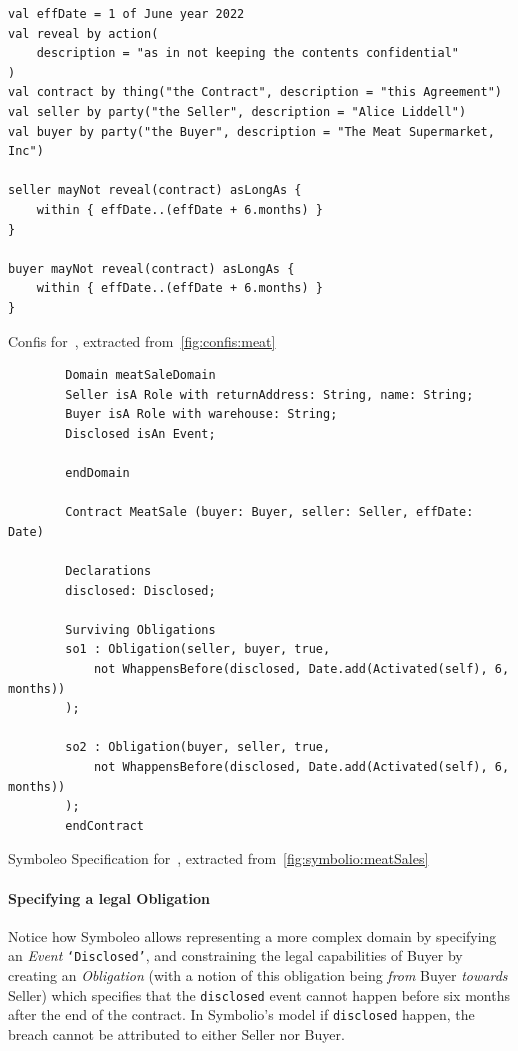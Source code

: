 \begin{listing}[h]
    \centering
    \begin{verbatim}
val effDate = 1 of June year 2022
val reveal by action(
    description = "as in not keeping the contents confidential"
)
val contract by thing("the Contract", description = "this Agreement")
val seller by party("the Seller", description = "Alice Liddell")
val buyer by party("the Buyer", description = "The Meat Supermarket, Inc")

seller mayNot reveal(contract) asLongAs {
    within { effDate..(effDate + 6.months) }
}

buyer mayNot reveal(contract) asLongAs {
    within { effDate..(effDate + 6.months) }
}
    \end{verbatim}
    \caption{Confis for~, extracted from~\autoref{fig:confis:meat}}
    \label{fig:confis:meat-confidentiality}
\end{listing}

\begin{listing}[h]
    \begin{verbatim}
        Domain meatSaleDomain
        Seller isA Role with returnAddress: String, name: String;
        Buyer isA Role with warehouse: String;
        Disclosed isAn Event;

        endDomain

        Contract MeatSale (buyer: Buyer, seller: Seller, effDate: Date)

        Declarations
        disclosed: Disclosed;

        Surviving Obligations
        so1 : Obligation(seller, buyer, true,
            not WhappensBefore(disclosed, Date.add(Activated(self), 6, months))
        );

        so2 : Obligation(buyer, seller, true,
            not WhappensBefore(disclosed, Date.add(Activated(self), 6, months))
        );
        endContract
    \end{verbatim}
    \caption{Symboleo Specification for~, extracted from~\autoref{fig:symbolio:meatSales}}
    \label{fig:symbolio:meatSales-confidentiality}
\end{listing}

\paragraph{Specifying a legal Obligation}
Notice how Symboleo allows representing a more complex domain by specifying an \emph{Event} \texttt{`Disclosed'}, and constraining the legal capabilities of Buyer by creating an \emph{Obligation} (with a notion of this obligation being \emph{from} Buyer \emph{towards} Seller) which specifies that the \texttt{disclosed} event cannot happen before six months after the end of the contract.
In Symbolio's model if \texttt{disclosed} happen, the breach cannot be attributed to either Seller nor Buyer.

